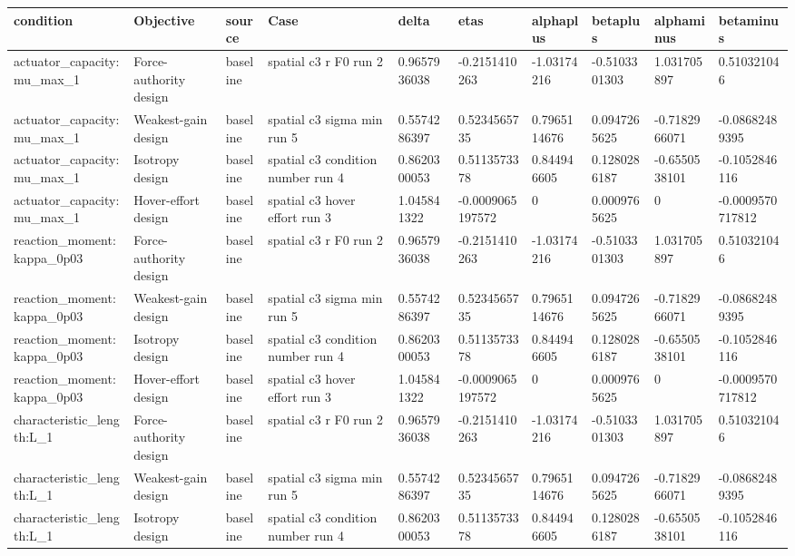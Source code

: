 \begin{tabular}{@{}llllllllll@{}}
\toprule
condition & Objective & source & Case & delta & etas & alphaplus & betaplus & alphaminus & betaminus \\
\midrule
actuator\_capacity:mu\_max\_1 & Force-authority design & baseline & spatial c3 r F0 run 2 & 0.9657936038 & -0.2151410263 & -1.03174216 & -0.5103301303 & 1.031705897 & 0.510321046 \\
actuator\_capacity:mu\_max\_1 & Weakest-gain design & baseline & spatial c3 sigma min run 5 & 0.5574286397 & 0.5234565735 & 0.7965114676 & 0.0947265625 & -0.7182966071 & -0.08682489395 \\
actuator\_capacity:mu\_max\_1 & Isotropy design & baseline & spatial c3 condition number run 4 & 0.8620300053 & 0.5113573378 & 0.844946605 & 0.1280286187 & -0.6550538101 & -0.1052846116 \\
actuator\_capacity:mu\_max\_1 & Hover-effort design & baseline & spatial c3 hover effort run 3 & 1.045841322 & -0.0009065197572 & 0 & 0.0009765625 & 0 & -0.0009570717812 \\
reaction\_moment:kappa\_0p03 & Force-authority design & baseline & spatial c3 r F0 run 2 & 0.9657936038 & -0.2151410263 & -1.03174216 & -0.5103301303 & 1.031705897 & 0.510321046 \\
reaction\_moment:kappa\_0p03 & Weakest-gain design & baseline & spatial c3 sigma min run 5 & 0.5574286397 & 0.5234565735 & 0.7965114676 & 0.0947265625 & -0.7182966071 & -0.08682489395 \\
reaction\_moment:kappa\_0p03 & Isotropy design & baseline & spatial c3 condition number run 4 & 0.8620300053 & 0.5113573378 & 0.844946605 & 0.1280286187 & -0.6550538101 & -0.1052846116 \\
reaction\_moment:kappa\_0p03 & Hover-effort design & baseline & spatial c3 hover effort run 3 & 1.045841322 & -0.0009065197572 & 0 & 0.0009765625 & 0 & -0.0009570717812 \\
characteristic\_length:L\_1 & Force-authority design & baseline & spatial c3 r F0 run 2 & 0.9657936038 & -0.2151410263 & -1.03174216 & -0.5103301303 & 1.031705897 & 0.510321046 \\
characteristic\_length:L\_1 & Weakest-gain design & baseline & spatial c3 sigma min run 5 & 0.5574286397 & 0.5234565735 & 0.7965114676 & 0.0947265625 & -0.7182966071 & -0.08682489395 \\
characteristic\_length:L\_1 & Isotropy design & baseline & spatial c3 condition number run 4 & 0.8620300053 & 0.5113573378 & 0.844946605 & 0.1280286187 & -0.6550538101 & -0.1052846116 \\

\end{tabular}
